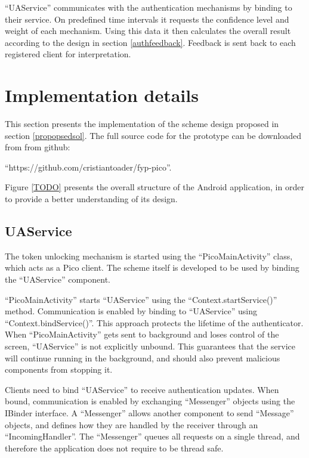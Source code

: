 ``UAService'' communicates with the authentication mechanisms by binding to their service. On predefined time intervals it requests the confidence level and weight of each mechanism. Using this data it then calculates the overall result according to the design in section \ref{authfeedback}. Feedback is sent back to each registered client for interpretation.

\section{Implementation details}
This section presents the implementation of the scheme design proposed in section \ref{propopsedsol}. The full source code for the prototype can be downloaded from from github: 

``https://github.com/cristiantoader/fyp-pico''.

Figure \ref{TODO} presents the overall structure of the Android application, in order to provide a better understanding of its design.

\subsection{UAService}
The token unlocking mechanism is started using the ``PicoMainActivity'' class, which acts as a Pico client. The scheme itself is developed to be used by binding the ``UAService'' component.

``PicoMainActivity'' starts ``UAService'' using the ``Context.startService()'' method. Communication is enabled by binding to ``UAService'' using ``Context.bindService()''. This approach protects the lifetime of the authenticator. When ``PicoMainActivity'' gets sent to background and loses control of the screen, ``UAService'' is not explicitly unbound. This guarantees that the service will continue running in the background, and should also prevent malicious components from stopping it. 

Clients need to bind ``UAService'' to receive authentication updates. When bound, communication is enabled by exchanging ``Messenger'' objects using the IBinder interface. A ``Messenger'' allows another component to send ``Message'' objects, and defines how they are handled by the receiver through an ``IncomingHandler''. The ``Messenger'' queues all requests on a single thread, and therefore the application does not require to be thread safe. 

